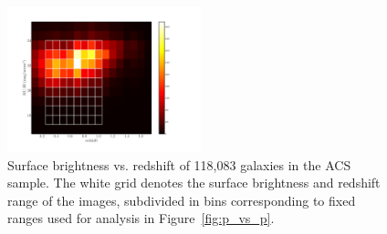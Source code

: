\documentclass[twocolumn]{aastex6}
\begin{document}
\begin{figure}
\begin{center}
\includegraphics[width=0.5\textwidth]{figures/eye_of_sauron.pdf}
\caption{Surface brightness vs. redshift of 118,083 galaxies in the ACS sample. The white grid denotes the surface brightness and redshift range of the \ferengi{} images, subdivided in bins corresponding to fixed ranges used for analysis in Figure~\ref{fig:p_vs_p}.}
\label{fig:sb_redshift}
\end{center}
\end{figure}
\end{document}
